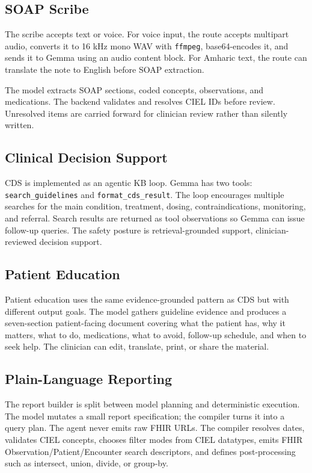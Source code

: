 \documentclass[11pt]{article}
\begin{document}
\subsection{SOAP Scribe}

The scribe accepts text or voice. For voice input, the route accepts multipart audio, converts it to 16 kHz mono WAV with \texttt{ffmpeg}, base64-encodes it, and sends it to Gemma using an audio content block. For Amharic text, the route can translate the note to English before SOAP extraction.

The model extracts SOAP sections, coded concepts, observations, and medications. The backend validates and resolves CIEL IDs before review. Unresolved items are carried forward for clinician review rather than silently written.

\subsection{Clinical Decision Support}

CDS is implemented as an agentic KB loop. Gemma has two tools: \texttt{search\_guidelines} and \texttt{format\_cds\_result}. The loop encourages multiple searches for the main condition, treatment, dosing, contraindications, monitoring, and referral. Search results are returned as tool observations so Gemma can issue follow-up queries. The safety posture is retrieval-grounded support, clinician-reviewed decision support.

\subsection{Patient Education}

Patient education uses the same evidence-grounded pattern as CDS but with different output goals. The model gathers guideline evidence and produces a seven-section patient-facing document covering what the patient has, why it matters, what to do, medications, what to avoid, follow-up schedule, and when to seek help. The clinician can edit, translate, print, or share the material.

\subsection{Plain-Language Reporting}

The report builder is split between model planning and deterministic execution. The model mutates a small report specification; the compiler turns it into a query plan. The agent never emits raw FHIR URLs. The compiler resolves dates, validates CIEL concepts, chooses filter modes from CIEL datatypes, emits FHIR Observation/Patient/Encounter search descriptors, and defines post-processing such as intersect, union, divide, or group-by.
\end{document}
